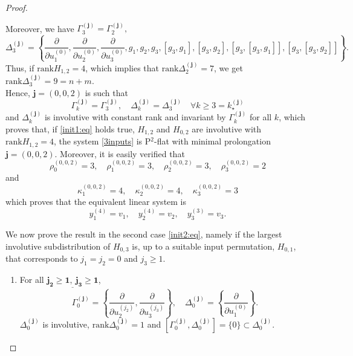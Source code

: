 \documentclass[10pt]{article}
\newcommand{\3}{\mathbf{3}}
\newcommand{\2}{\mathbf{2}}
\newcommand{\1}{\mathbf{1}}
\newcommand{\0}{\mathbf{0}}
\newcommand{\mbf}[1]{\mathbf{#1}}
\newcommand{\rk}{\mathrm{rank}}
\newcommand{\ddu}[2]{\frac{\partial}{\partial u_{#1}^{(#2)}}}
\begin{document}
\begin{proof}
\begin{enumerate}
Moreover, we have 
\newline
$\Gamma_{3}^{(\mbf{j})} = \Gamma_{2}^{(\mbf{j})},$
$$\Delta_{3}^{(\mbf{j})} = \left\{\ddu{1}{0}, \ddu{2}{0}, \ddu{3}{0}, g_{1}, g_{2}, g_{3},[g_{3},g_{1}], [g_{3},g_{2}], [g_{3},[g_{3},g_{1}]], [g_{3},[g_{3},g_{2}]] \right\}.$$
Thus, if  $\rk H_{1,2} = 4$, which implies that $\rk \Delta_{2}^{(\mbf{j})} = 7$,  we get $\rk \Delta_{3}^{(\mbf{j})} = 9= n+m$. \\
Hence,  $\mbf{j} = (0,0,2)$ is such that
$$\Gamma_{k}^{(\mbf{j})} = \Gamma_{3}^{(\mbf{j})} , \quad \Delta_{k}^{(\mbf{j})} =\Delta_{3}^{(\mbf{j})} \quad \forall k\geq 3 = k_{\star}^{(\mbf{j})}$$
and $\Delta_{k}^{(\mbf{j})}$ is involutive with constant rank  and invariant by $\Gamma_{k}^{(\mbf{j})}$ for all $k$,
which proves that, if \eqref{init1:eq} holds true, $H_{1,2}$ and $H_{0,2}$  are involutive with $\rk H_{1,2} = 4$, the system \eqref{3inputs} is P$^{2}$-flat with minimal prolongation $\mbf{j}=(0,0,2)$. Moreover, it is easily verified that
$$\rho_{0}^{(0,0,2)}= 3, \quad \rho_{1}^{(0,0,2)}= 3, \quad \rho_{2}^{(0,0,2)}= 3, \quad \rho_{3}^{(0,0,2)}= 2$$
and
$$\kappa_{1}^{(0,0,2)}= 4, \quad \kappa_{2}^{(0,0,2)}= 4, \quad \kappa_{3}^{(0,0,2)}= 3$$
which proves that the equivalent linear system is
\begin{equation}\label{linequiv1:eq}
y_{1}^{(4)}= v_{1}, \quad y_{2}^{(4)}= v_{2}, \quad y_{3}^{(3)}= v_{3}.
\end{equation}

\end{enumerate}
\bigskip


We now prove the result in the second case \eqref{init2:eq}, namely if the largest involutive subdistribution of $H_{0,3}$ is, up to a suitable input permutation, $H_{0,1}$, that corresponds to $j_{1} = j_{2}=0$ and $j_3 \geq 1$.


\begin{enumerate}

\item[\framebox{\Large{$\mathbf{k=0}$}}]
For all $\underline{\mathbf{j_{2}\geq 1,~ j_{3} \geq 1}}$,
$$\Gamma_{0}^{(\mbf{j})} = \left\{\ddu{2}{j_{2}}, \ddu{3}{j_{3}}\right\}, \quad \Delta_{0}^{(\mbf{j})} = \left\{\ddu{1}{0}\right\}.$$
$\Delta_{0}^{(\mbf{j})}$ is involutive, $\rk \Delta_{0}^{(\mbf{j})}= 1$ and $[\Gamma_{0}^{(\mbf{j})}, \Delta_{0}^{(\mbf{j})}] = \{ 0 \} \subset \Delta_{0}^{(\mbf{j})}$.


\end{enumerate}
\end{proof}
\end{document}
